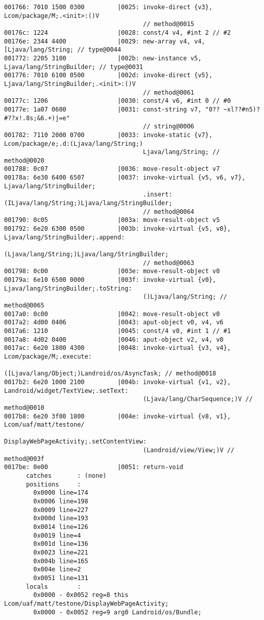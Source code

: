 \begin{lstlisting}
001766: 7010 1500 0300         |0025: invoke-direct {v3}, Lcom/package/M;.<init>:()V
                                      // method@0015
00176c: 1224                   |0028: const/4 v4, #int 2 // #2
00176e: 2344 4400              |0029: new-array v4, v4, [Ljava/lang/String; // type@0044
001772: 2205 3100              |002b: new-instance v5, Ljava/lang/StringBuilder; // type@0031
001776: 7010 6100 0500         |002d: invoke-direct {v5}, Ljava/lang/StringBuilder;.<init>:()V
                                      // method@0061
00177c: 1206                   |0030: const/4 v6, #int 0 // #0
00177e: 1a07 0600              |0031: const-string v7, "0?? ~xl??#n5)?#??x!.8s;&6.+)j=e"
                                      // string@0006
001782: 7110 2000 0700         |0033: invoke-static {v7}, Lcom/package/e;.d:(Ljava/lang/String;)
                                      Ljava/lang/String; // method@0020
001788: 0c07                   |0036: move-result-object v7
00178a: 6e30 6400 6507         |0037: invoke-virtual {v5, v6, v7}, Ljava/lang/StringBuilder;
                                      .insert:(ILjava/lang/String;)Ljava/lang/StringBuilder;
                                      // method@0064
001790: 0c05                   |003a: move-result-object v5
001792: 6e20 6300 0500         |003b: invoke-virtual {v5, v0}, Ljava/lang/StringBuilder;.append:
                                      (Ljava/lang/String;)Ljava/lang/StringBuilder;
                                      // method@0063
001798: 0c00                   |003e: move-result-object v0
00179a: 6e10 6500 0000         |003f: invoke-virtual {v0}, Ljava/lang/StringBuilder;.toString:
                                      ()Ljava/lang/String; // method@0065
0017a0: 0c00                   |0042: move-result-object v0
0017a2: 4d00 0406              |0043: aput-object v0, v4, v6
0017a6: 1210                   |0045: const/4 v0, #int 1 // #1
0017a8: 4d02 0400              |0046: aput-object v2, v4, v0
0017ac: 6e20 1800 4300         |0048: invoke-virtual {v3, v4}, Lcom/package/M;.execute:
                                      ([Ljava/lang/Object;)Landroid/os/AsyncTask; // method@0018
0017b2: 6e20 1000 2100         |004b: invoke-virtual {v1, v2}, Landroid/widget/TextView;.setText:
                                      (Ljava/lang/CharSequence;)V // method@0010
0017b8: 6e20 3f00 1800         |004e: invoke-virtual {v8, v1}, Lcom/uaf/matt/testone/
                                      DisplayWebPageActivity;.setContentView:
                                      (Landroid/view/View;)V // method@003f
0017be: 0e00                   |0051: return-void
      catches       : (none)
      positions     :
        0x0000 line=174
        0x0006 line=198
        0x0009 line=227
        0x000d line=193
        0x0014 line=126
        0x0019 line=4
        0x001d line=136
        0x0023 line=221
        0x004b line=165
        0x004e line=2
        0x0051 line=131
      locals        :
        0x0000 - 0x0052 reg=8 this Lcom/uaf/matt/testone/DisplayWebPageActivity;
        0x0000 - 0x0052 reg=9 arg0 Landroid/os/Bundle;


\end{lstlisting}
